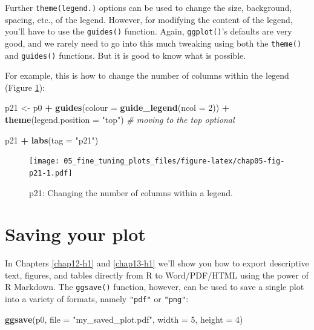 \documentclass[
  12pt,
  krantz2]{krantz}
\makeatletter
\newenvironment{Shaded}{\begin{snugshade}}{\end{snugshade}}
\newcommand{\CommentTok}[1]{\textcolor[rgb]{0.56,0.35,0.01}{\textit{#1}}}
\newcommand{\DataTypeTok}[1]{\textcolor[rgb]{0.13,0.29,0.53}{#1}}
\newcommand{\DecValTok}[1]{\textcolor[rgb]{0.00,0.00,0.81}{#1}}
\newcommand{\KeywordTok}[1]{\textcolor[rgb]{0.13,0.29,0.53}{\textbf{#1}}}
\newcommand{\NormalTok}[1]{#1}
\newcommand{\OperatorTok}[1]{\textcolor[rgb]{0.81,0.36,0.00}{\textbf{#1}}}
\newcommand{\StringTok}[1]{\textcolor[rgb]{0.31,0.60,0.02}{#1}}
\newenvironment{kframe}{%
\medskip{}
\setlength{\fboxsep}{.8em}
 \def\at@end@of@kframe{}%
 \ifinner\ifhmode%
  \def\at@end@of@kframe{\end{minipage}}%
  \begin{minipage}{\columnwidth}%
 \fi\fi%
 \def\FrameCommand##1{\hskip\@totalleftmargin \hskip-\fboxsep
 \colorbox{shadecolor}{##1}\hskip-\fboxsep
     \hskip-\linewidth \hskip-\@totalleftmargin \hskip\columnwidth}%
 \MakeFramed {\advance\hsize-\width
   \@totalleftmargin\z@ \linewidth\hsize
   \@setminipage}}%
 {\par\unskip\endMakeFramed%
 \at@end@of@kframe}
\renewenvironment{Shaded}{\begin{kframe}}{\end{kframe}}
\makeatother
\begin{document}
Further \texttt{theme(legend.)} options can be used to change the size, background, spacing, etc., of the legend.
However, for modifying the content of the legend, you'll have to use the \texttt{guides()} function.
Again, \texttt{ggplot()}'s defaults are very good, and we rarely need to go into this much tweaking using both the \texttt{theme()} and \texttt{guides()} functions. But it is good to know what is possible.

For example, this is how to change the number of columns within the legend (Figure \ref{fig:chap05-fig-p21}):

\begin{Shaded}
\begin{Highlighting}[]
\NormalTok{p21 <-}\StringTok{ }\NormalTok{p0 }\OperatorTok{+}
\StringTok{  }\KeywordTok{guides}\NormalTok{(}\DataTypeTok{colour =} \KeywordTok{guide_legend}\NormalTok{(}\DataTypeTok{ncol =} \DecValTok{2}\NormalTok{)) }\OperatorTok{+}
\StringTok{  }\KeywordTok{theme}\NormalTok{(}\DataTypeTok{legend.position =} \StringTok{"top"}\NormalTok{) }\CommentTok{# moving to the top optional}

\NormalTok{p21 }\OperatorTok{+}\StringTok{ }\KeywordTok{labs}\NormalTok{(}\DataTypeTok{tag =} \StringTok{"p21"}\NormalTok{)}
\end{Highlighting}
\end{Shaded}

\begin{figure}
\centering
\texttt{[image: 05\_fine\_tuning\_plots\_files/figure-latex/chap05-fig-p21-1.pdf]}
\caption{\label{fig:chap05-fig-p21}p21: Changing the number of columns within a legend.}
\end{figure}

\hypertarget{saving-your-plot}{%
\section{Saving your plot}\label{saving-your-plot}}


In Chapters \ref{chap12-h1} and \ref{chap13-h1} we'll show you how to export descriptive text, figures, and tables directly from R to Word/PDF/HTML using the power of R Markdown.
The \texttt{ggsave()} function, however, can be used to save a single plot into a variety of formats, namely \texttt{"pdf"} or \texttt{"png"}:

\begin{Shaded}
\begin{Highlighting}[]
\KeywordTok{ggsave}\NormalTok{(p0, }\DataTypeTok{file =} \StringTok{"my_saved_plot.pdf"}\NormalTok{, }\DataTypeTok{width =} \DecValTok{5}\NormalTok{, }\DataTypeTok{height =} \DecValTok{4}\NormalTok{)}
\end{Highlighting}
\end{Shaded}
\end{document}

